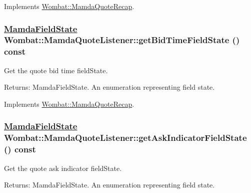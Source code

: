Implements \hyperlink{classWombat_1_1MamdaQuoteRecap_bea1b72396575311378b1b4063ab1734}{Wombat::Mamda\-Quote\-Recap}.\hypertarget{classWombat_1_1MamdaQuoteListener_a8d10456d404dc1ed3fe7231e89a62b3}{
\subsubsection[getBidTimeFieldState]{\setlength{\rightskip}{0pt plus 5cm}\hyperlink{namespaceWombat_93aac974f2ab713554fd12a1fa3b7d2a}{Mamda\-Field\-State} Wombat::Mamda\-Quote\-Listener::get\-Bid\-Time\-Field\-State () const}}
\label{classWombat_1_1MamdaQuoteListener_a8d10456d404dc1ed3fe7231e89a62b3}


Get the quote bid time field\-State. 

\begin{Desc}
\item[Returns:]Mamda\-Field\-State. An enumeration representing field state. \end{Desc}


Implements \hyperlink{classWombat_1_1MamdaQuoteRecap_c5406a153ad823049ce414a442f6a25b}{Wombat::Mamda\-Quote\-Recap}.\hypertarget{classWombat_1_1MamdaQuoteListener_20c6b7c6cf1359fdd184a7d83bc93521}{
\subsubsection[getAskIndicatorFieldState]{\setlength{\rightskip}{0pt plus 5cm}\hyperlink{namespaceWombat_93aac974f2ab713554fd12a1fa3b7d2a}{Mamda\-Field\-State} Wombat::Mamda\-Quote\-Listener::get\-Ask\-Indicator\-Field\-State () const}}
\label{classWombat_1_1MamdaQuoteListener_20c6b7c6cf1359fdd184a7d83bc93521}


Get the quote ask indicator field\-State. 

\begin{Desc}
\item[Returns:]Mamda\-Field\-State. An enumeration representing field state. \end{Desc}


